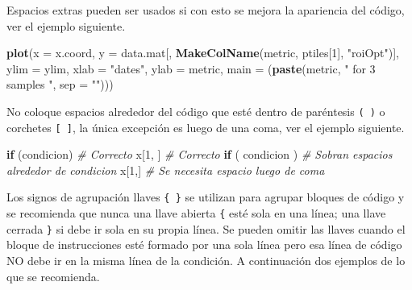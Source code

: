 \documentclass[10pt,]{krantz}
\makeatletter
\newenvironment{Shaded}{\begin{snugshade}}{\end{snugshade}}
\newcommand{\KeywordTok}[1]{\textcolor[rgb]{0.13,0.29,0.53}{\textbf{#1}}}
\newcommand{\DataTypeTok}[1]{\textcolor[rgb]{0.13,0.29,0.53}{#1}}
\newcommand{\DecValTok}[1]{\textcolor[rgb]{0.00,0.00,0.81}{#1}}
\newcommand{\StringTok}[1]{\textcolor[rgb]{0.31,0.60,0.02}{#1}}
\newcommand{\CommentTok}[1]{\textcolor[rgb]{0.56,0.35,0.01}{\textit{#1}}}
\newcommand{\ControlFlowTok}[1]{\textcolor[rgb]{0.13,0.29,0.53}{\textbf{#1}}}
\newcommand{\NormalTok}[1]{#1}
\newenvironment{kframe}{%
\medskip{}
\setlength{\fboxsep}{.8em}
 \def\at@end@of@kframe{}%
 \ifinner\ifhmode%
  \def\at@end@of@kframe{\end{minipage}}%
  \begin{minipage}{\columnwidth}%
 \fi\fi%
 \def\FrameCommand##1{\hskip\@totalleftmargin \hskip-\fboxsep
 \colorbox{shadecolor}{##1}\hskip-\fboxsep
     \hskip-\linewidth \hskip-\@totalleftmargin \hskip\columnwidth}%
 \MakeFramed {\advance\hsize-\width
   \@totalleftmargin\z@ \linewidth\hsize
   \@setminipage}}%
 {\par\unskip\endMakeFramed%
 \at@end@of@kframe}
\renewenvironment{Shaded}{\begin{kframe}}{\end{kframe}}
\makeatother
\begin{document}
Espacios extras pueden ser usados si con esto se mejora la apariencia
del código, ver el ejemplo siguiente.

\begin{Shaded}
\begin{Highlighting}[]
\KeywordTok{plot}\NormalTok{(}\DataTypeTok{x    =}\NormalTok{ x.coord,}
     \DataTypeTok{y    =}\NormalTok{ data.mat[, }\KeywordTok{MakeColName}\NormalTok{(metric, ptiles[}\DecValTok{1}\NormalTok{], }\StringTok{"roiOpt"}\NormalTok{)],}
     \DataTypeTok{ylim =}\NormalTok{ ylim,}
     \DataTypeTok{xlab =} \StringTok{"dates"}\NormalTok{,}
     \DataTypeTok{ylab =}\NormalTok{ metric,}
     \DataTypeTok{main =}\NormalTok{ (}\KeywordTok{paste}\NormalTok{(metric, }\StringTok{" for 3 samples "}\NormalTok{, }\DataTypeTok{sep =} \StringTok{""}\NormalTok{)))}
\end{Highlighting}
\end{Shaded}

No coloque espacios alrededor del código que esté dentro de paréntesis
\texttt{(\ )} o corchetes \texttt{{[}\ {]}}, la única excepción es luego
de una coma, ver el ejemplo siguiente.

\begin{Shaded}
\begin{Highlighting}[]
\ControlFlowTok{if}\NormalTok{ (condicion)    }\CommentTok{# Correcto }
\NormalTok{x[}\DecValTok{1}\NormalTok{, ]            }\CommentTok{# Correcto}
\ControlFlowTok{if}\NormalTok{ ( condicion )  }\CommentTok{# Sobran espacios alrededor de condicion}
\NormalTok{x[}\DecValTok{1}\NormalTok{,]             }\CommentTok{# Se necesita espacio luego de coma}
\end{Highlighting}
\end{Shaded}

Los signos de agrupación llaves \texttt{\{\ \}} se utilizan para agrupar
bloques de código y se recomienda que nunca una llave abierta
\texttt{\{} esté sola en una línea; una llave cerrada \texttt{\}} si
debe ir sola en su propia línea. Se pueden omitir las llaves cuando el
bloque de instrucciones esté formado por una sola línea pero esa línea
de código NO debe ir en la misma línea de la condición. A continuación
dos ejemplos de lo que se recomienda.
\end{document}
